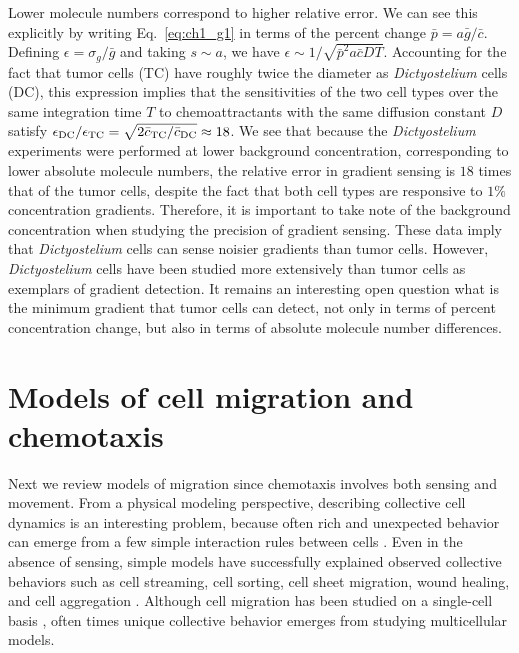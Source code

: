 Lower molecule numbers correspond to higher relative error. We can see this explicitly by writing Eq.\ \ref{eq:ch1_g1} in terms of the percent change $\bar{p} = a\bar{g}/\bar{c}$. Defining $\epsilon = \sigma_g/\bar{g}$ and taking $s \sim a$, we have
$\epsilon \sim 1/\sqrt{\bar{p}^2a\bar{c}DT}$.
Accounting for the fact that tumor cells (TC) have roughly twice the diameter as \textit{Dictyostelium} cells (DC), this expression implies that the sensitivities of the two cell types over the same integration time $T$ to chemoattractants with the same diffusion constant $D$ satisfy
$\epsilon_{\rm DC}/\epsilon_{\rm TC} = \sqrt{2\bar{c}_{\rm TC}/\bar{c}_{\rm DC}} \approx 18$.
We see that because the \textit{Dictyostelium} experiments were performed at lower background concentration, corresponding to lower absolute molecule numbers, the relative error in gradient sensing is $18$ times that of the tumor cells, despite the fact that both cell types are responsive to $1\%$ concentration gradients. Therefore, it is important to take note of the background concentration when studying the precision of gradient sensing. These data imply that \textit{Dictyostelium} cells can sense noisier gradients than tumor cells. However, \textit{Dictyostelium} cells have been studied more extensively than tumor cells as exemplars of gradient detection. It remains an interesting open question what is the minimum gradient that tumor cells can detect, not only in terms of percent concentration change, but also in terms of absolute molecule number differences.


\section{Models of cell migration and chemotaxis}

Next we review models of migration since chemotaxis involves both sensing and movement. From a physical modeling perspective, describing collective cell dynamics is an interesting problem, because often rich and unexpected behavior can emerge from a few simple interaction rules between cells \cite{vicsek1995novel,coburn2013tactile}.
Even in the absence of sensing, simple models have successfully explained observed collective behaviors such as cell streaming, cell sorting, cell sheet migration, wound healing, and cell aggregation \cite{kabla2012collective,szabo2010collective,basan2013alignment,janulevicius2015short}.
Although cell migration has been studied on a single-cell basis \cite{shao2010computational}, often times unique collective behavior emerges from studying multicellular models.


